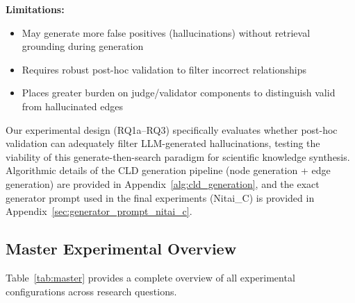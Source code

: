 \textbf{Limitations:}
\begin{itemize}[noitemsep]
    \item May generate more false positives (hallucinations) without retrieval grounding during generation
    \item Requires robust post-hoc validation to filter incorrect relationships
    \item Places greater burden on judge/validator components to distinguish valid from hallucinated edges
\end{itemize}

Our experimental design (RQ1a--RQ3) specifically evaluates whether post-hoc validation can adequately filter LLM-generated hallucinations, testing the viability of this generate-then-search paradigm for scientific knowledge synthesis.
Algorithmic details of the CLD generation pipeline (node generation + edge generation) are provided in Appendix~\ref{alg:cld_generation}, and the exact generator prompt used in the final experiments (Nitai\_C) is provided in Appendix~\ref{sec:generator_prompt_nitai_c}.

\subsection{Master Experimental Overview}

Table~\ref{tab:master} provides a complete overview of all experimental configurations across research questions.

